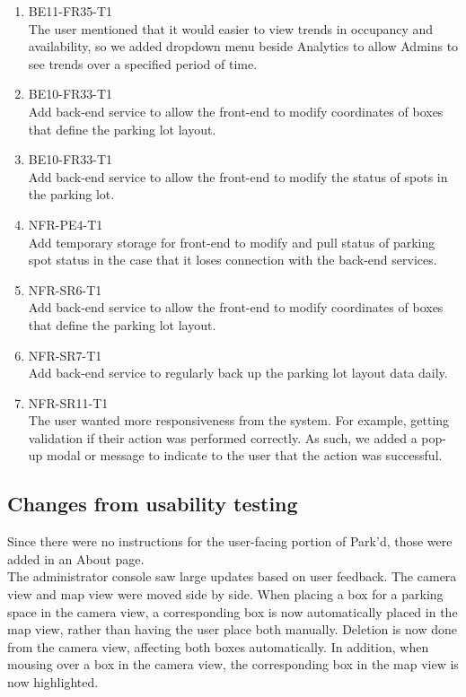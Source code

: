 \documentclass[12pt, titlepage]{article}
\begin{document}
\begin{enumerate}
    \item BE11-FR35-T1\\
    The user mentioned that it would easier to view trends in occupancy and
    availability, so we added dropdown menu beside Analytics to allow Admins to
    see trends over a specified period of time.
    \item BE10-FR33-T1\\
    Add back-end service to allow the front-end to modify coordinates of boxes
    that define the parking lot layout.
    \item BE10-FR33-T1\\
    Add back-end service to allow the front-end to modify the status of spots in
    the parking lot.
    \item NFR-PE4-T1\\
    Add temporary storage for front-end to modify and pull status of parking
    spot status in the case that it loses connection with the back-end services.
    \item NFR-SR6-T1\\
    Add back-end service to allow the front-end to modify coordinates of boxes
    that define the parking lot layout.
    \item NFR-SR7-T1\\
    Add back-end service to regularly back up the parking lot layout data daily.
    \item NFR-SR11-T1\\
    The user wanted more responsiveness from the system. For example, getting
    validation if their action was performed correctly. As such, we added a
    pop-up modal or message to indicate to the user that the action was
    successful.
\end{enumerate}
\subsection{Changes from usability testing}
Since there were no instructions for the user-facing portion of Park'd, those
were added in an About page.\\
The administrator console saw large updates based on user feedback. The camera
view and map view were moved side by side. When placing a box for a parking
space in the camera view, a corresponding box is now automatically placed in the
map view, rather than having the user place both manually. Deletion is now done
from the camera view, affecting both boxes automatically. In addition, when
mousing over a box in the camera view, the corresponding box in the map view is
now highlighted.
\end{document}
